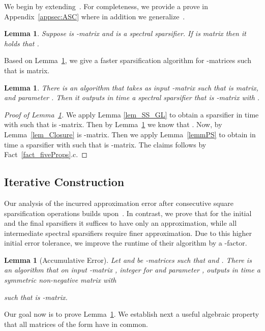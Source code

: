 \documentclass[11pt]{article}
\newcommand{\lemref}[1]{Lemma~\ref{lem:#1}}
\newcommand{\mylemma}[2]{\begin{lem}\label{lem:#1}#2\end{lem}}
\newtheorem{lem}[thm]{Lemma}
\numberwithin{thm}{section}
\begin{document}
We begin by extending~\cite[Lemma 4.3 and 4.4]{arxivCCLPT15}. For completeness, we provide a prove in Appendix~\ref{appsec:ASC} where in addition we generalize~\cite[Fact 4.2]{arxivCCLPT15}.


\newcommand{\lemSchurRec}
{
Suppose  is -matrix
and  is a spectral sparsifier.
If  is  matrix then it holds that .
}
\mylemma{lemSchurRec}{\lemSchurRec}


Based on \lemref{lemSchurRec}, we give a faster sparsification algorithm for -matrices  such that  is  matrix.

\begin{lem}\label{lem_my_GL}
There is an algorithm 
that takes as input -matrix  such that
 is  matrix, and parameter .
Then it outputs in 
time a spectral sparsifier 
that is -matrix with .
\end{lem}

\begin{proof}[Proof of Lemma~\ref{lem_my_GL}] We apply Lemma \ref{lem_SS_GL} to obtain
a sparsifier  in 
time with 
such that  is -matrix. Then by \lemref{lemSchurRec} we know that .
Now, by Lemma~\ref{lem_Closure} 
is -matrix. Then we apply Lemma~\ref{lemmPS}
to obtain in 
time a sparsifier 
with 
such that  is -matrix. The claims follows by Fact~\ref{fact_fiveProps}.c.
\end{proof}

\subsection{Iterative Construction}\label{subsec:IterConst}

Our analysis of the incurred approximation error after  consecutive square sparsification operations builds upon~\cite[Lemma 4.1]{arxivCCLPT15}. In contrast, we prove that for the initial and the final sparsifiers it suffices to have only an  approximation, while all intermediate spectral sparsifiers require finer  approximation. Due to this higher initial error tolerance, we improve the runtime of their algorithm by a -factor.

\begin{lem}[Accumulative Error]\label{lem_IndSS}
Let  and  be -matrices such that  and . There is an algorithm  that on input -matrix , integer  for  and parameter , outputs in time  a symmetric non-negative matrix  with

such that  is -matrix.
\end{lem}

Our goal now is to prove Lemma~\ref{lem_IndSS}. We establish next a useful algebraic property that all matrices of the form  have in common.
\end{document}
